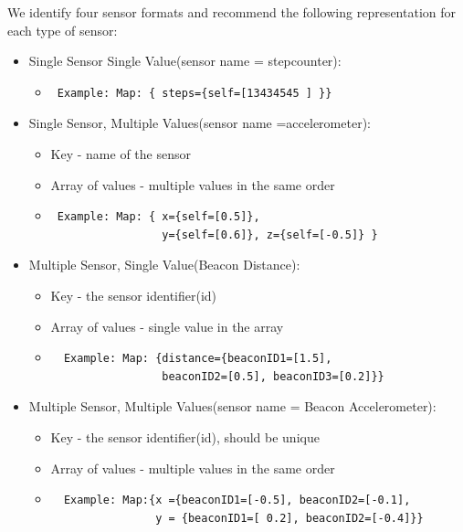 We identify four sensor formats and recommend the following representation for each type of sensor:
\begin{itemize}
  \item Single Sensor Single Value(sensor name = stepcounter):
  \begin{itemize}
    \item \begin{verbatim} Example: Map: { steps={self=[13434545 ] }} \end{verbatim}                                                              
  \end{itemize}
 
  \item  Single Sensor, Multiple Values(sensor name =accelerometer):
  \begin{itemize}
    \item Key - name of the sensor
    \item Array of values - multiple values in the same order
    \item \begin{verbatim} Example: Map: { x={self=[0.5]},
                 y={self=[0.6]}, z={self=[-0.5]} } \end{verbatim}  
  \end{itemize}

 
  \item Multiple Sensor, Single Value(Beacon Distance):
  \begin{itemize}
    \item Key - the sensor identifier(id)
    \item Array of values - single value in the array
    \item  \begin{verbatim}  Example: Map: {distance={beaconID1=[1.5],
                 beaconID2=[0.5], beaconID3=[0.2]}} \end{verbatim}  
  \end{itemize}

  \item  Multiple Sensor, Multiple Values(sensor name = Beacon Accelerometer):
  \begin{itemize}
    \item Key - the sensor identifier(id), should be unique
    \item Array of values - multiple values in the same order
    \item  \begin{verbatim}  Example: Map:{x ={beaconID1=[-0.5], beaconID2=[-0.1],
                y = {beaconID1=[ 0.2], beaconID2=[-0.4]}} \end{verbatim}  
 \end{itemize}


\end{itemize}


